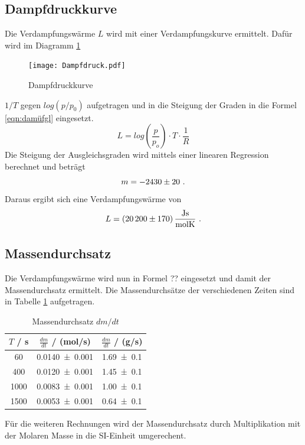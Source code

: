 \subsection{Dampfdruckkurve}
Die Verdampfungswärme $L$ wird mit einer Verdampfungskurve ermittelt. Dafür wird im Diagramm \ref{fig:dampfdruck}
\begin{figure}
  \centering
  \texttt{[image: Dampfdruck.pdf]}
  \caption{Dampfdruckkurve}
  \label{fig:dampfdruck}
\end{figure}
$1/T$ gegen $log(p/p_0)$ aufgetragen und in die Steigung der Graden in die Formel \ref{eqn:damüfgl} eingesetzt.
\begin{equation}
  L = log \left( \frac{p}{p_o} \right) \cdot T \cdot \frac{1}{R}
  \label{eqn:dampfgl}
\end{equation}
Die Steigung der Ausgleichsgraden wird mittels einer linearen Regression berechnet und beträgt
\begin{equation*}
  m = \num{-2430 +- 20} \ .
\end{equation*}
Daraus ergibt sich eine Verdampfungswärme von
\begin{equation}
  L = (\num{20200 +- 170}) \, \frac{\text{Js}}{\text{molK}} \ .
\end{equation}
\subsection{Massendurchsatz}
Die Verdampfungswärme wird nun in Formel ?? eingesetzt und damit der Massendurchsatz ermittelt. Die Massendurchsätze der verschiedenen Zeiten sind in Tabelle \ref{tab:dm/dt} aufgetragen.
\begin{table}
  \centering
  \begin{tabular}{c c c}
    \toprule
    $T$ / s & $\frac{dm}{dt}$ / (mol/s) & $\frac{dm}{dt}$ / (g/s) \\
    \midrule
    60   & \num{0.0140 +- 0.001} & \num{1.69 +- 0.1}\\
    400  & \num{0.0120 +- 0.001} & \num{1.45 +- 0.1}\\
    1000 & \num{0.0083 +- 0.001} & \num{1.00 +- 0.1}\\
    1500 & \num{0.0053 +- 0.001} & \num{0.64 +- 0.1}\\
    \bottomrule
  \end{tabular}
  \caption{Massendurchsatz $dm/dt$}
  \label{tab:dm/dt}
\end{table}
Für die weiteren Rechnungen wird der Massendurchsatz durch Multiplikation mit der Molaren Masse in die SI-Einheit umgerechent.
